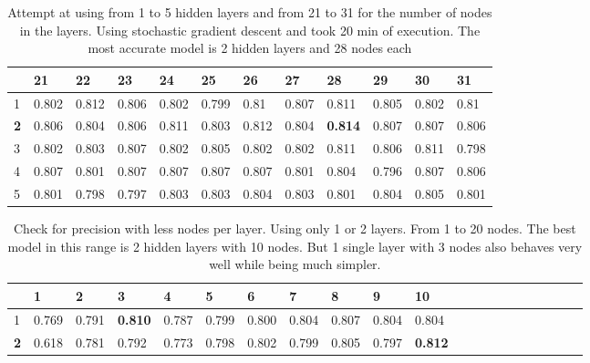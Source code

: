 \documentclass{article}
\begin{document}
\begin{table}[]
\caption{Attempt at using from 1 to 5 hidden layers and from 21 to 31 for the number of nodes in the layers. Using stochastic gradient descent and took 20 min of execution.
The most  accurate model is 2 hidden layers and 28 nodes each}
\label{tab:Scaled_gradient}
\begin{tabular}{|l|l|l|l|l|l|l|l|l|l|l|l|}
\hline
           & 21    & 22    & 23    & 24    & 25    & 26    & 27    & \textbf{28}    & 29    & 30    & 31    \\ \hline
1          & 0.802 & 0.812 & 0.806 & 0.802 & 0.799 & 0.81  & 0.807 & 0.811          & 0.805 & 0.802 & 0.81  \\ \hline
\textbf{2} & 0.806 & 0.804 & 0.806 & 0.811 & 0.803 & 0.812 & 0.804 & \textbf{0.814} & 0.807 & 0.807 & 0.806 \\ \hline
3          & 0.802 & 0.803 & 0.807 & 0.802 & 0.805 & 0.802 & 0.802 & 0.811          & 0.806 & 0.811 & 0.798 \\ \hline
4          & 0.807 & 0.801 & 0.807 & 0.807 & 0.807 & 0.807 & 0.801 & 0.804          & 0.796 & 0.807 & 0.806 \\ \hline
5          & 0.801 & 0.798 & 0.797 & 0.803 & 0.803 & 0.804 & 0.803 & 0.801          & 0.804 & 0.805 & 0.801 \\ \hline
\end{tabular}
\end{table}

\begin{center}
\begin{table}[]
\caption{Check for precision with less nodes per layer. Using only 1 or 2 layers. From 1 to 20 nodes. The best model in this range is 2 hidden layers with 10 nodes. But 1 single layer with 3 nodes also behaves very well while being much simpler.}
\label{tab:NN-LessNodesPerLayer}
\begin{tabular}{|l|l|l|l|l|l|l|l|l|l|l|l|l|l|l|l|l|l|l|l|l|}
\hline\
    & 1     & 2     & 3              & 4     & 5     & 6     & 7     & 8     & 9     & \textbf{10}  \\ \hline
1          & 0.769 & 0.791 & \textbf{0.810} & 0.787 & 0.799 & 0.800 & 0.804 & 0.807 & 0.804 & 0.804 \\ \hline
\textbf{2} & 0.618 & 0.781 & 0.792          & 0.773 & 0.798 & 0.802 & 0.799 & 0.805 & 0.797 & \textbf{0.812} \\ \hline
\end{tabular}
\end{table}
\end{center}
 
\end{document}

